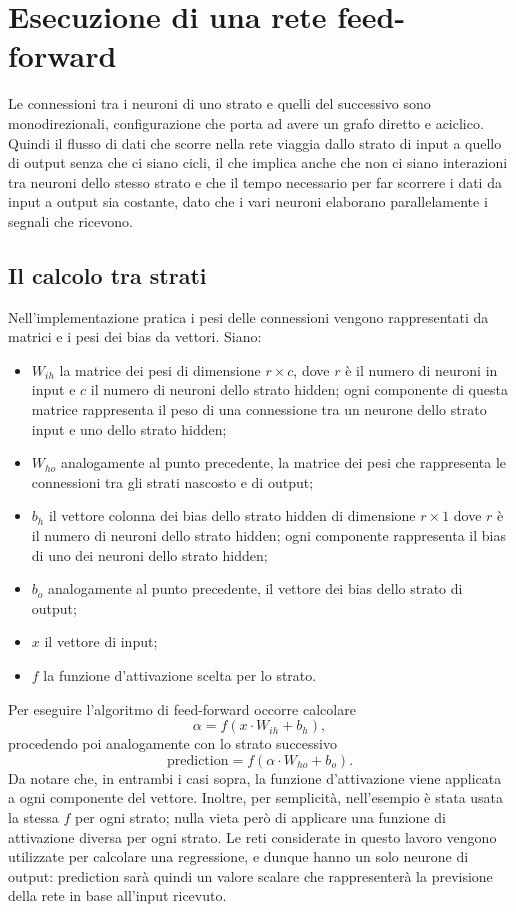 \documentclass[12pt]{report}
\begin{document}
\section{Esecuzione di una rete feed-forward}
Le connessioni tra i neuroni di uno strato e quelli del successivo sono monodirezionali, configurazione che porta ad avere un grafo diretto e aciclico. Quindi il flusso di dati che scorre nella rete viaggia dallo strato di input a quello di output senza che ci siano cicli, il che implica anche che non ci siano interazioni tra neuroni dello stesso strato e che il tempo necessario per far scorrere i dati da input a output sia costante, dato che i vari neuroni elaborano parallelamente i segnali che ricevono.

\subsection{Il calcolo tra strati}\label{feedforward}
Nell'implementazione pratica i pesi delle connessioni vengono rappresentati da matrici  e i pesi dei bias da vettori. 
Siano:
\begin{itemize}
\item{$W_{ih}$} la matrice dei pesi di dimensione $r \times c$, dove $r$ è il numero di neuroni in input e $c$ il numero di neuroni dello strato hidden; ogni componente di questa matrice rappresenta il peso di una connessione tra un neurone dello strato input e uno dello strato hidden;
\item{$W_{ho}$} analogamente al punto precedente, la matrice dei pesi che rappresenta le connessioni tra gli strati nascosto e di output;
\item{$b_h$} il vettore colonna dei bias dello strato hidden di dimensione $r \times 1$ dove $r$ è il numero di neuroni dello strato hidden; ogni componente rappresenta il bias di uno dei neuroni dello strato hidden;
\item{$b_o$} analogamente al punto precedente, il vettore dei bias dello strato di output;
\item{$x$} il vettore di input;
\item{$f$} la funzione d'attivazione scelta per lo strato.
\end{itemize}
Per eseguire l'algoritmo di feed-forward occorre calcolare
$$\alpha = f\left(x \cdot W_{ih} + b_h\right),$$
procedendo poi analogamente con lo strato successivo
$$\mathrm{prediction} = f\left(\alpha \cdot W_{ho} + b_o\right).$$
Da notare che, in entrambi i casi sopra, la funzione d'attivazione viene applicata a ogni componente del vettore. Inoltre, per semplicità, nell'esempio è stata usata la stessa $f$ per ogni strato; nulla vieta però di applicare una funzione di attivazione diversa per ogni strato.
Le reti considerate in questo lavoro vengono utilizzate per calcolare una regressione, e dunque hanno un solo neurone di output: prediction sarà quindi un valore scalare che rappresenterà la previsione della rete in base all'input ricevuto.
\newpage
\end{document}
